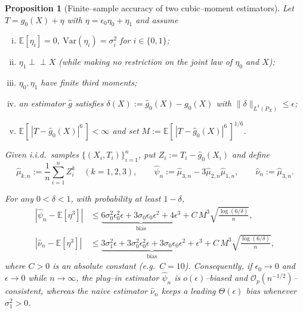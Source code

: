 \documentclass{article}
\def\eps{{\epsilon}}
\newcommand{\E}{\mathbb{E}}
\newcommand{\Var}{\mathrm{Var}}
\def\mrm#1{\mathrm{#1}}
\def\Var{\mrm{Var}} %
\newtheorem{proposition}{Proposition}[section]
\newcommand{\ind}{\perp\!\!\!\!\perp}
\begin{document}
\begin{proposition}[Finite–sample accuracy of two cubic–moment estimators]
\label{prop:sample-bias}
Let $T=g_0(X)+\eta$ with $\eta=\eps_{0}\eta_{0}+\eta_{1}$ and assume  
\begin{enumerate}[(i)]
    \item $\E[\eta_i]=0,\ \Var(\eta_i)=\sigma_i^{2}$ for $i\in\{0,1\}$;
    \item $\eta_{1}\ind X$ (while making no restriction on the joint law of $\eta_{0}$ and $X$);
    \item $\eta_{0},\eta_{1}$ have finite third moments;
    \item an estimator $\hat g$ satisfies $\delta(X):=\hat g_0(X)-g_0(X)$ with $\|\delta\|_{L^{3}(P_X)}\le\eps$;
    \item $\E[\,|T-\hat g_0(X)|^{6}\,]<\infty$ and set $M:=\E[\,|T-\hat g_0(X)|^{6}\,]^{1/6}$.
\end{enumerate}

Given i.i.d.\ samples $\{(X_i,T_i)\}_{i=1}^{n}$, put $Z_i:=T_i-\hat g_0(X_i)$ and define  
\[
\hat\mu_{k,n}:=\frac1n\sum_{i=1}^{n}Z_i^{k}\quad(k=1,2,3),\qquad
\hat\psi_{n}:=\hat\mu_{3,n}-3\hat\mu_{2,n}\hat\mu_{1,n},\qquad
\hat\nu_{n}:=\hat\mu_{3,n}.
\]

For any $0<\delta<1$, with probability at least $1-\delta$,
\begin{align}
|\hat\psi_{n}-\E[\eta^{3}]|
&\le
\underbrace{6\sigma_{0}^{2}\eps_{0}^{2}\eps+3\sigma_{0}\eps_{0}\eps^{2}+4\eps^{3}}_{\text{bias}}
+C\,M^{3}\sqrt{\frac{\log(6/\delta)}{n}},\label{eq:psi-bound}\\
|\hat\nu_{n}-\E[\eta^{3}]|
&\le
\underbrace{3\sigma_{1}^{2}\eps+3\sigma_{0}^{2}\eps_{0}^{2}\eps+3\sigma_{0}\eps_{0}\eps^{2}+\eps^{3}}_{\text{bias}}
+C\,M^{3}\sqrt{\frac{\log(6/\delta)}{n}},\label{eq:nu-bound}
\end{align}
where $C>0$ is an absolute constant (e.g.\ $C=10$).  Consequently, if $\eps_{0}\to0$ and $\eps\to0$ while $n\to\infty$, the plug–in estimator $\hat\psi_{n}$ is $o(\eps)$–biased and $\mathcal O_{p}(n^{-1/2})$–consistent, whereas the naive estimator $\hat\nu_{n}$ keeps a leading $\Theta(\eps)$ bias whenever $\sigma_{1}^{2}>0$.

\end{proposition}
\end{document}
